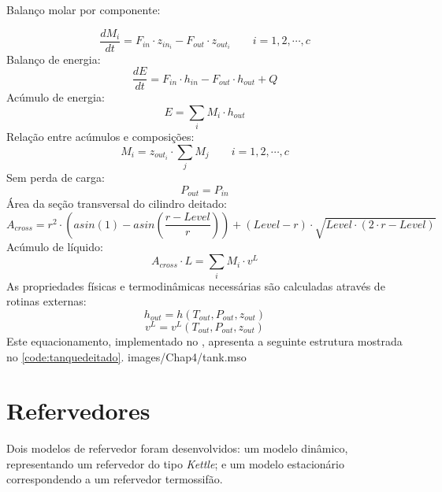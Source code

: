 \begin{flushleft}
Balanço molar por componente:
\end{flushleft}
\begin{equation}
\dfrac{dM_i}{dt} = F_{in} \cdot z_{in_i} - F_{out}  \cdot z_{out_i}  \qquad i=1,2,\cdots,c
\end{equation}
Balanço de energia:
\begin{equation}
\dfrac{dE}{dt} = F_{in} \cdot h_{in} - F_{out}  \cdot h_{out} + Q
\end{equation}
Acúmulo de energia:
\begin{equation}
E = \sum_i M_i \cdot h_{out}
\end{equation}
Relação entre acúmulos e composições:
\begin{equation}
M_i = z_{out_i} \cdot \sum_j M_j \qquad i=1,2,\cdots,c
\end{equation}
Sem perda de carga:
\begin{equation}
P_{out} = P_{in}
\end{equation}
Área da seção transversal do cilindro deitado:
\begin{equation}
A_{cross} = r^2 \cdot \left( asin(1) - asin(\dfrac{r-Level}{r}) \right)  + (Level-r) \cdot \sqrt{Level \cdot (2 \cdot r - Level)}
\end{equation}
Acúmulo de líquido:
\begin{equation}
A_{cross} \cdot L = \sum_i M_i \cdot v^L
\end{equation}
As propriedades físicas e termodinâmicas necessárias são calculadas através de rotinas externas:
\begin{equation}
h_{out} = h(T_{out}, P_{out}, z_{out})
\end{equation}
\begin{equation}
v^L = v^L(T_{out}, P_{out}, z_{out})
\end{equation}
Este equacionamento, implementado no \emso, apresenta a seguinte estrutura
mostrada no \autoref{code:tanquedeitado}.
 {images/Chap4/tank.mso}

\section{Refervedores}
Dois modelos de refervedor foram desenvolvidos: um modelo dinâmico, representando um refervedor do tipo
\textit{Kettle}; e um modelo estacionário correspondendo a um refervedor termossifão.

